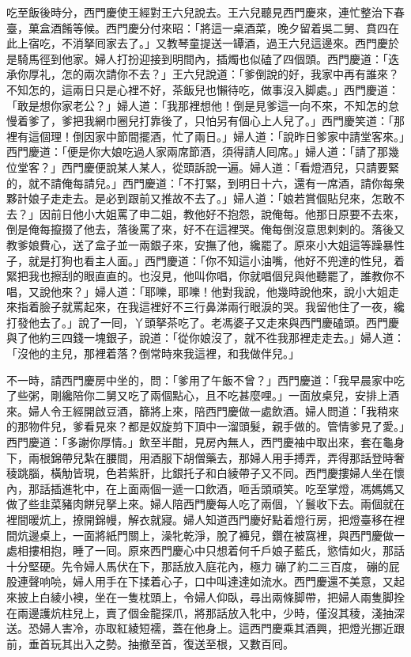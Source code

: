 吃至飯後時分，西門慶使王經對王六兒說去。王六兒聽見西門慶來，連忙整治下春臺，菓盒酒餚等候。西門慶分付來昭：「將這一桌酒菜，晚夕留着吳二舅、賁四在此上宿吃，不消拏囘家去了。」又教琴童提送一罈酒，過王六兒這邊來。西門慶於是騎馬徑到他家。婦人打扮迎接到明間內，插燭也似磕了四個頭。西門慶道：「迭承你厚礼，怎的兩次請你不去？」王六兒說道：「爹倒說的好，我家中再有誰來？不知怎的，這兩日只是心裡不好，茶飯兒也懶待吃，做事沒入脚處。」西門慶道：「敢是想你家老公？」婦人道：「我那裡想他！倒是見爹這一向不來，不知怎的怠慢着爹了，爹把我網巾圈兒打靠後了，只怕另有個心上人兒了。」西門慶笑道：「那裡有這個理！倒因家中節間擺酒，忙了兩日。」婦人道：「說昨日爹家中請堂客來。」西門慶道：「便是你大娘吃過人家兩席節酒，須得請人囘席。」婦人道：「請了那幾位堂客？」西門慶便說某人某人，從頭訴說一遍。婦人道：「看燈酒兒，只請要緊的，就不請俺每請兒。」西門慶道：「不打緊，到明日十六，還有一席酒，請你每衆夥計娘子走走去。是必到跟前又推故不去了。」婦人道：「娘若賞個貼兒來，怎敢不去？」{}因前日他小大姐罵了申二姐，教他好不抱怨，說俺每。他那日原要不去來，倒是俺每攛掇了他去，落後罵了來，好不在這裡哭。俺每倒沒意思剌剌的。落後又教爹娘費心，送了盒子並一兩銀子來，安撫了他，纔罷了。原來小大姐這等躁暴性子，就是打狗也看主人面。」西門慶道：「你不知這小油嘴，他好不兜達的性兒，着緊把我也擦刮的眼直直的。也沒見，他叫你唱，你就唱個兒與他聽罷了，誰教你不唱，又說他來？」婦人道：「耶嚛，耶嚛！他對我說，他幾時說他來，說小大姐走來指着臉子就罵起來，在我這裡好不三行鼻涕兩行眼淚的哭。我留他住了一夜，纔打發他去了。」說了一囘，丫頭拏茶吃了。老馮婆子又走來與西門慶磕頭。西門慶與了他約三四錢一塊銀子，說道：「從你娘沒了，就不徃我那裡走走去。」婦人道：「沒他的主兒，那裡着落？倒常時來我這裡，和我做伴兒。」

不一時，請西門慶房中坐的，問：「爹用了午飯不曾？」西門慶道：「我早晨家中吃了些粥，剛纔陪你二舅又吃了兩個點心，且不吃甚麼哩。」一面放桌兒，安排上酒來。婦人令王經開啟豆酒，篩將上來，陪西門慶做一處飲酒。婦人問道：「我稍來的那物件兒，爹看見來？都是奴旋剪下頂中一溜頭髮，親手做的。管情爹見了愛。」西門慶道：「多謝你厚情。」飲至半酣，見房內無人，西門慶袖中取出來，{}套在龜身下，兩根錦帶兒紮在腰間，用酒服下胡僧藥去，那婦人用手搏弄，弄得那話登時奢稜跳腦，橫觔皆現，色若紫肝，比銀托子和白綾帶子又不同。西門慶摟婦人坐在懷內，那話插進牝中，在上面兩個一遞一口飲酒，咂舌頭頑笑。吃至掌燈，馮媽媽又做了些韭菜豬肉餅兒拏上來。婦人陪西門慶每人吃了兩個，丫鬟收下去。兩個就在裡間暖炕上，撩開錦幔，解衣就寢。婦人知道西門慶好點着燈行房，把燈臺移在裡間炕邊桌上，一面將紙門關上，澡牝乾淨，脫了褲兒，鑽在被窩裡，與西門慶做一處相摟相抱，睡了一囘。{}原來西門慶心中只想着何千戶娘子藍氏，慾情如火，那話十分堅硬。先令婦人馬伏在下，那話放入庭花內，極力𢵞磞了約二三百度，𢵞磞的屁股連聲响喨，婦人用手在下揉着心子，口中叫達達如流水。西門慶還不美意，又起來披上白綾小襖，坐在一隻枕頭上，令婦人仰臥，尋出兩條脚帶，把婦人兩隻脚拴在兩邊護炕柱兒上，賣了個金龍探爪，將那話放入牝中，少時，僅沒其稜，淺抽深送。恐婦人害冷，亦取紅綾短襦，蓋在他身上。這西門慶乘其酒興，把燈光挪近跟前，垂首玩其出入之勢。抽撤至首，復送至根，又數百囘。

